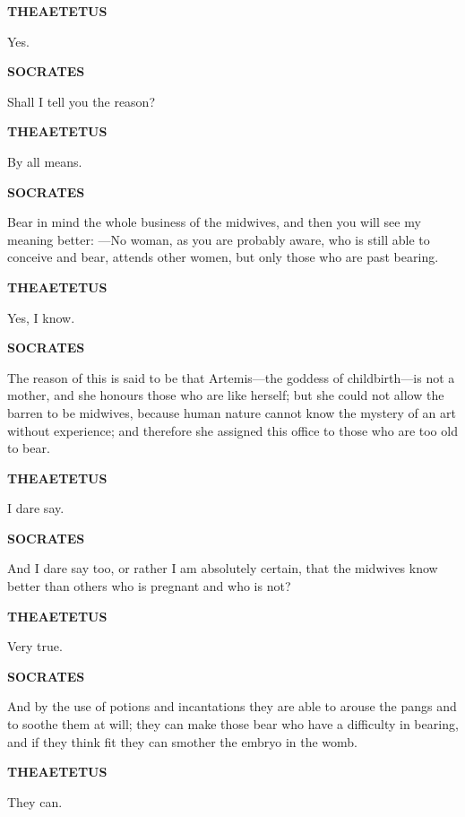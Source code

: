 \documentclass[11pt,letter]{article}
\begin{document}
\par \textbf{THEAETETUS}
\par   Yes.

\par \textbf{SOCRATES}
\par   Shall I tell you the reason?

\par \textbf{THEAETETUS}
\par   By all means.

\par \textbf{SOCRATES}
\par   Bear in mind the whole business of the midwives, and then you will see my meaning better: —No woman, as you are probably aware, who is still able to conceive and bear, attends other women, but only those who are past bearing.

\par \textbf{THEAETETUS}
\par   Yes, I know.

\par \textbf{SOCRATES}
\par   The reason of this is said to be that Artemis—the goddess of childbirth—is not a mother, and she honours those who are like herself; but she could not allow the barren to be midwives, because human nature cannot know the mystery of an art without experience; and therefore she assigned this office to those who are too old to bear.

\par \textbf{THEAETETUS}
\par   I dare say.

\par \textbf{SOCRATES}
\par   And I dare say too, or rather I am absolutely certain, that the midwives know better than others who is pregnant and who is not?

\par \textbf{THEAETETUS}
\par   Very true.

\par \textbf{SOCRATES}
\par   And by the use of potions and incantations they are able to arouse the pangs and to soothe them at will; they can make those bear who have a difficulty in bearing, and if they think fit they can smother the embryo in the womb.

\par \textbf{THEAETETUS}
\par   They can.
\end{document}
